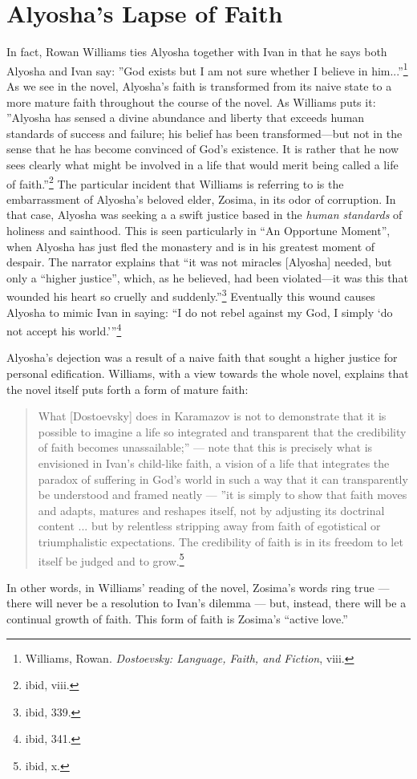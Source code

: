 \section{Alyosha's Lapse of Faith}
In fact, Rowan Williams ties Alyosha together with Ivan in that he says both Alyosha and Ivan say: ''God exists but I am not sure whether I believe in him...''\footnote{Williams, Rowan. \emph{Dostoevsky: Language, Faith, and Fiction}, viii.} As we see in the novel, Alyosha's faith is transformed from its naive state to a more mature faith throughout the course of the novel. As Williams puts it: ''Alyosha has sensed a divine abundance and liberty that exceeds human standards of success and failure; his belief has been transformed---but not in the sense that he has become convinced of God's existence. It is rather that he now sees clearly what might be involved in a life that would merit being called a life of faith.''\footnote{ibid, viii.} The particular incident that Williams is referring to is the embarrassment of Alyosha's beloved elder, Zosima, in its odor of corruption. In that case, Alyosha was seeking a a swift justice based in the \emph{human standards} of holiness and sainthood. This is seen particularly in ``An Opportune Moment'', when Alyosha has just fled the monastery and is in his greatest moment of despair. The narrator explains that ``it was not miracles [Alyosha] needed, but only a ``higher justice'', which, as he believed, had been violated---it was this that wounded his heart so cruelly and suddenly.''\footnote{ibid, 339.} Eventually this wound causes Alyosha to mimic Ivan in saying: ``I do not rebel against my God, I simply `do not accept his world.'''\footnote{ibid, 341.}

Alyosha's dejection was a result of a naive faith that sought a higher justice for personal edification. Williams, with a view towards the whole novel, explains that the novel itself puts forth a form of mature faith:
\begin{quote}
What [Dostoevsky] does in Karamazov is not to demonstrate that it is possible to imagine a life so integrated and transparent that the credibility of faith becomes unassailable;'' --- note that this is precisely what is envisioned in Ivan's child-like faith, a vision of a life that integrates the paradox of suffering in God's world in such a way that it can transparently be understood and framed neatly --- ''it is simply to show that faith moves and adapts, matures and reshapes itself, not by adjusting its doctrinal content ... but by relentless stripping away from faith of egotistical or triumphalistic expectations. The credibility of faith is in its freedom to let itself be judged and to grow.\footnote{ibid, x.} 
\end{quote}
In other words, in Williams' reading of the novel, Zosima's words ring true --- there will never be a resolution to Ivan's dilemma --- but, instead, there will be a continual growth of faith. This form of faith is Zosima's ``active love.''

